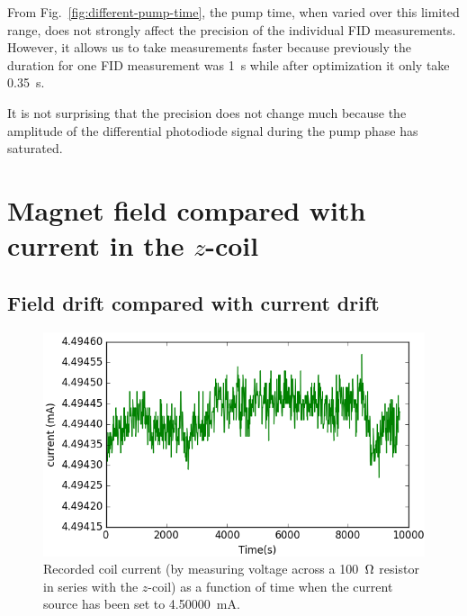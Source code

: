 From Fig.~\ref{fig:different-pump-time}, the pump time, when varied
over this limited range, does not strongly affect the precision of the
individual FID measurements.   However, it allows us to take
  measurements faster because previously the duration for one FID measurement was 1~s while after optimization it only take 0.35~s. 
  

It is not surprising that the precision does not change much because
the amplitude of the differential photodiode signal during the pump
phase has saturated.



\section{Magnet field compared with current in the $z$-coil}

\subsection{Field drift compared with current drift\label{sec:current-drift}}

\begin{figure}%
\centering
\includegraphics[width=0.7\linewidth]{figures/current}
\caption{Recorded coil current (by measuring voltage across a
  100~$\ohm$ resistor in series with the $z$-coil) as a function of
  time when the current source has been set to
  4.50000~mA.\label{fig:current}}
\end{figure}

